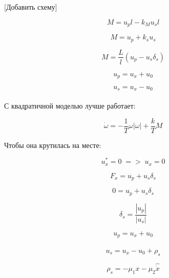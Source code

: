 [Добавить схему]

\begin{equation*}
M = u_pl - k_Mu_sl
\end{equation*}

\begin{equation*}
M = u_p + k_su_s
\end{equation*}

\begin{equation*}
M = \frac{L}{l}(u_p - u_s\delta_s)
\end{equation*}

\begin{equation*}
u_p = u_x + u_0
\end{equation*}

\begin{equation*}
u_s = u_x - u_0
\end{equation*} \\

С квадратичной моделью лучше работает:

\begin{equation*}
\Dot{\omega} = -\frac{1}{T}\omega|\omega| + \frac{k}{T}M
\end{equation*}

Чтобы она крутилась на месте:

\begin{equation*}
u_x^* = 0\; => \; u_x = 0 
\end{equation*}

\begin{equation*}
F_x = u_p + u_s \delta_s
\end{equation*}

\begin{equation*}
0 = u_p + u_s \delta_s
\end{equation*}

\begin{equation*}
\delta_s = \frac{|u_p|}{|u_s|}
\end{equation*}




\begin{equation*}
u_p = u_x + u_0
\end{equation*} \\

\begin{equation*}
u_s = u_x - u_0 + \rho_s
\end{equation*} 

\begin{equation*}
\rho_s = -\mu_1x - \mu_2\hat{\Dot{x}}
\end{equation*} \\
